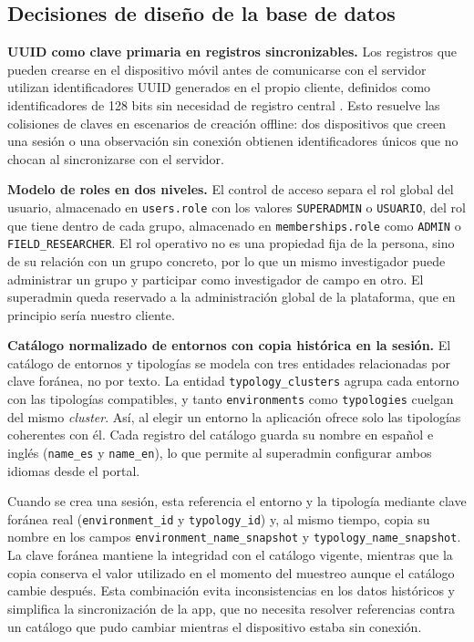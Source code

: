 \subsection{Decisiones de diseño de la base de datos}

\textbf{UUID como clave primaria en registros sincronizables.}
Los registros que pueden crearse en el dispositivo móvil antes de comunicarse con el
servidor utilizan identificadores UUID generados en el propio cliente, definidos como
identificadores de 128 bits sin necesidad de registro central \cite{rfc9562uuid}. Esto
resuelve las colisiones de claves en escenarios de creación offline: dos dispositivos
que creen una sesión o una observación sin conexión obtienen identificadores únicos que
no chocan al sincronizarse con el servidor.

\textbf{Modelo de roles en dos niveles.}
El control de acceso separa el rol global del usuario, almacenado en
\texttt{users.role} con los valores \texttt{SUPERADMIN} o \texttt{USUARIO}, del rol que
tiene dentro de cada grupo, almacenado en \texttt{memberships.role} como \texttt{ADMIN}
o \texttt{FIELD\_RESEARCHER}. El rol operativo no es una propiedad fija de la persona,
sino de su relación con un grupo concreto, por lo que un mismo investigador puede
administrar un grupo y participar como investigador de campo en otro. El superadmin
queda reservado a la administración global de la plataforma, que en principio sería nuestro cliente.

\textbf{Catálogo normalizado de entornos con copia histórica en la sesión.}
El catálogo de entornos y tipologías se modela con tres entidades relacionadas por
clave foránea, no por texto. La entidad \texttt{typology\_clusters} agrupa cada entorno
con las tipologías compatibles, y tanto \texttt{environments} como \texttt{typologies}
cuelgan del mismo \textit{cluster}. Así, al elegir un entorno la aplicación ofrece solo
las tipologías coherentes con él. Cada registro del catálogo guarda su nombre en español
e inglés (\texttt{name\_es} y \texttt{name\_en}), lo que permite al superadmin configurar
ambos idiomas desde el portal.

Cuando se crea una sesión, esta referencia el entorno y la tipología mediante clave
foránea real (\texttt{environment\_id} y \texttt{typology\_id}) y, al mismo tiempo, copia
su nombre en los campos \texttt{environment\_name\_snapshot} y
\texttt{typology\_name\_snapshot}. La clave foránea mantiene la integridad con el catálogo
vigente, mientras que la copia conserva el valor utilizado en el momento del muestreo
aunque el catálogo cambie después. Esta combinación evita inconsistencias en los datos
históricos y simplifica la sincronización de la app, que no necesita resolver referencias
contra un catálogo que pudo cambiar mientras el dispositivo estaba sin conexión.

